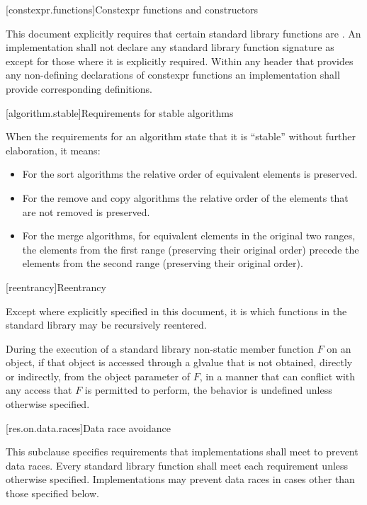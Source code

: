 [constexpr.functions]{Constexpr functions and constructors}

\pnum
This document explicitly requires that certain standard library functions are
. An implementation shall not declare
any standard library function signature as  except for those where
it is explicitly required.
Within any header that provides any non-defining declarations of constexpr
functions an implementation shall provide corresponding definitions.

[algorithm.stable]{Requirements for stable algorithms}

\pnum
{}%
%
When the requirements for an algorithm state that it is ``stable'' without further elaboration,
it means:

\begin{itemize}
\item For the sort algorithms the relative order of equivalent
elements is preserved.

\item For the remove and copy algorithms the relative order of
the elements that are not removed is preserved.

\item For the merge algorithms, for equivalent elements in
the original two ranges, the elements from the first range (preserving their
original order) precede the elements from the second range (preserving their
original order).
\end{itemize}

[reentrancy]{Reentrancy}

\pnum
Except where explicitly specified in this document, it is  which functions in the \Cpp{} standard
library may be recursively reentered.

\pnum
During the execution of
a standard library non-static member function $F$ on an object,
if that object is accessed through a glvalue that is not obtained,
directly or indirectly,
from the object parameter of $F$,
in a manner that can conflict
with any access that $F$ is permitted to perform,
the behavior is undefined unless otherwise specified.

[res.on.data.races]{Data race avoidance}

\pnum
This subclause specifies requirements that implementations shall meet to prevent data
races.
Every standard library function shall meet each requirement unless otherwise specified.
Implementations may prevent data races in cases other than those specified below.

